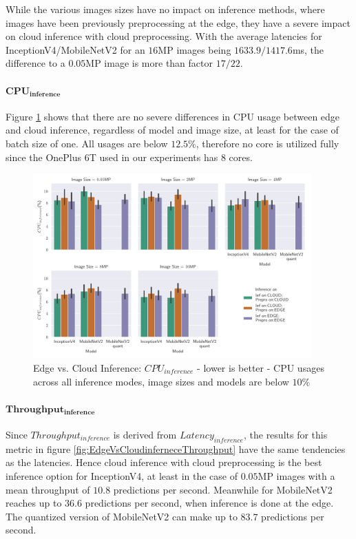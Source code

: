 While the various images sizes have no impact on inference methods, where images have been previously preprocessing at the edge, they have a severe impact on cloud inference with cloud preprocessing.
With the average latencies for InceptionV4/MobileNetV2 for an $16$MP images being $1633.9/1417.6$ms, the difference to a $0.05$MP image is more than factor $17/22$.

\paragraph{$\mathbf{CPU_{inference}}$}
Figure \ref{fig:EdgeVsCloudInferenceCPU} shows that there are no severe differences in CPU usage between edge and cloud inference, regardless of model and image size, at least for the case of batch size of one.
All usages are below $12.5\%$, therefore no core is utilized fully since the OnePlus 6T used in our experiments has $8$ cores.


\begin{figure}[!htb]
\centering
\includegraphics[width=0.95\textwidth]{./Bilder/single_plots/edge_vs_cloud_plots/Edge_vs_Cloud_Inference_Inference_CPU.pdf}
\caption[Edge vs. Cloud Inference:  $CPU_{inference}$ - lower is better]{Edge vs. Cloud Inference:  $CPU_{inference}$ - lower is better -
CPU usages across all inference modes, image sizes and models are below $10\%$}
\label{fig:EdgeVsCloudInferenceCPU}
\end{figure}


\paragraph{$\mathbf{Throughput_{inference}}$}
Since $Throughput_{inference}$ is derived from $Latency_{inference}$, the results for this metric in figure \ref{fig:EdgeVsCloudinferneceThroughput} have the same tendencies as the latencies.
Hence cloud inference with cloud preprocessing is the best inference option for InceptionV4, at least in the case of $0.05$MP images with a mean throughput of $10.8$ predictions per second.
Meanwhile for MobileNetV2 reaches up to $36.6$ predictions per second, when inference is done at the edge.
The quantized version of MobileNetV2 can make up to $83.7$ predictions per second.

